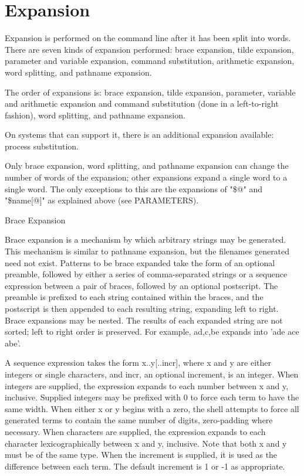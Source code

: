 \section{Expansion}\label{sec:expansion}
Expansion is performed on the command line after it has been split into words. There are seven kinds of expansion performed: brace expansion, tilde expansion, parameter and variable expansion, command substitution, arithmetic expansion, word splitting, and pathname expansion.

The order of expansions is: brace expansion, tilde expansion, parameter, variable and arithmetic expansion and command substitution (done in a left-to-right fashion), word splitting, and pathname expansion.

On systems that can support it, there is an additional expansion available: process substitution.

Only brace expansion, word splitting, and pathname expansion can change the number of words of the expansion; other expansions expand a single word to a single word. The only exceptions to this are the expansions of "\$@" and "\${name[@]}" as explained above (see PARAMETERS).

Brace Expansion

Brace expansion is a mechanism by which arbitrary strings may be generated. This mechanism is similar to pathname expansion, but the filenames generated need not exist. Patterns to be brace expanded take the form of an optional preamble, followed by either a series of comma-separated strings or a sequence expression between a pair of braces, followed by an optional postscript. The preamble is prefixed to each string contained within the braces, and the postscript is then appended to each resulting string, expanding left to right.
Brace expansions may be nested. The results of each expanded string are not sorted; left to right order is preserved. For example, a{d,c,b}e expands into 'ade ace abe'.

A sequence expression takes the form {x..y[..incr]}, where x and y are either integers or single characters, and incr, an optional increment, is an integer. When integers are supplied, the expression expands to each number between x and y, inclusive. Supplied integers may be prefixed with 0 to force each term to have the same width. When either x or y begins with a zero, the shell attempts to force all generated terms to contain the same number of digits, zero-padding where necessary. When characters are supplied, the expression expands to each character lexicographically between x and y, inclusive. Note that both x and y must be of the same type. When the increment is supplied, it is used as the difference between each term. The default increment is 1 or -1 as appropriate.

